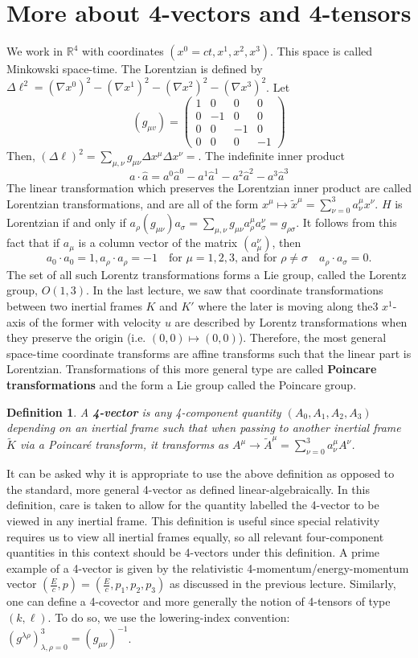 \documentclass{article}
\newcommand{\R}{\mathbb R}
\newtheorem{defn}{Definition}
\begin{document}
\section{More about 4-vectors and 4-tensors}
We work in $\R^4$ with coordinates $(x^0 = ct,x^1, x^2, x^3)$. This space is called Minkowski space-time. The Lorentzian is defined by $\Delta\ell^2  = (\nabla x^0)^2 - (\nabla x^1)^2 - (\nabla x^2)^2-(\nabla x^3)^2$. Let 
\[(g_{\mu v})=\begin{pmatrix}
    1 & 0 & 0 &0\\
    0& -1 & 0 & 0\\
    0& 0 & -1 & 0\\
    0& 0 & 0 & -1
\end{pmatrix}\]
Then, $(\Delta\ell)^2 = \sum_{\mu,\nu}g_{\mu \nu}\Delta x^\mu \Delta x^\nu = $. The indefinite inner product
\[a\cdot\hat a = a^0\hat a^0-a^1\hat a^1- a^2\hat a^2-a^3\hat a^3\]
The linear transformation which preserves the Lorentzian inner product are called Lorentzian transformations, and are all of the form $x^\mu\mapsto \tilde x^\mu = \sum_{\nu=0}^3 a^\mu_\nu x^\nu$. $H$ is Lorentzian if and only if $a_\rho (g_{\mu\nu})a_\sigma=\sum_{\mu,\nu}g_{\mu \nu} a^\mu_\rho a^\nu_\sigma = g_{\rho\sigma}$. It follows from this fact that if $a_\mu$ is a column vector of the matrix $(a_\mu^\nu)$, then
\[a_0\cdot a_0 = 1,  a_\rho\cdot a_\rho = -1\quad\text{for $\mu = 1,2,3$, and for $\rho\neq \sigma$}\quad a_\rho\cdot a_\sigma = 0.\]
The set of all such Lorentz transformations forms a Lie group, called the Lorentz group, $O(1,3)$. In the last lecture, we saw that coordinate transformations between two inertial frames $K$ and $K'$ where the later is moving along the3 $x^1$-axis of the former with velocity $u$ are described by Lorentz transformations when they preserve the origin (i.e. $(0,0)\mapsto (0,0)$). Therefore, the most general space-time coordinate transforms are affine transforms such that the linear part is Lorentzian. Transformations of this more general type are called \textbf{Poincare transformations} and the form a Lie group called the Poincare group.
\begin{defn}
    A \textbf{4-vector} is any 4-component quantity $(A_0,A_1,A_2,A_3)$ depending on an inertial frame such that when passing to another inertial frame $\tilde K$ via a Poincar\'e transform, it transforms as $A^\mu\to \tilde A^\mu = \sum^3_{\nu=0}a^\mu_\nu A^\nu$.
\end{defn}
It can be asked why it is appropriate to use the above definition as opposed to the standard, more general 4-vector as defined linear-algebraically. In this definition, care is taken to allow for the quantity labelled the 4-vector to be viewed in any inertial frame. This definition is useful since special relativity requires us to view all inertial frames equally, so all relevant four-component quantities in this context should be 4-vectors under this definition. A prime example of a 4-vector is given by the relativistic 4-momentum/energy-momentum vector $\left(\frac{E}{c},p\right) = \left(\frac{E}{c},p_1,p_2,p_3\right)$ as discussed in the previous lecture. Similarly, one can define a 4-covector and more generally the notion of 4-tensors of type $(k,\ell)$. To do so, we use the lowering-index convention: $(g^{\lambda\rho})_{\lambda,\rho=0}^3 = (g_{\mu\nu})^{-1}$.
\end{document}
